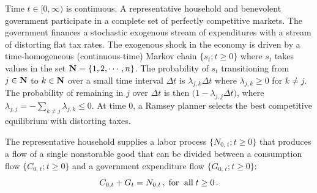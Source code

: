 \documentclass[12pt]{article}
\begin{document}
Time $t \in [0, \infty)$ is continuous.  
A representative household and  benevolent government  participate  in  a complete set of  perfectly competitive markets.  The government finances a stochastic exogenous stream of expenditures with  a stream of distorting  flat tax rates. %
The exogenous  shock in the economy is driven by a time-homogeneous (continuous-time) Markov chain $\{s_t; t\geq 0\}$ where $s_t$ takes values in the set ${\bf N} = \{1, 2, \cdots, n\}$. The probability of $s_t$ transitioning from  $j\in {\bf N} $ to $k \in {\bf N}$ over a small time interval $\Delta t$ is  $\lambda_{j, k}\Delta t$ where $\lambda_{j, k} \geq 0$  for   $k\neq j$. The probability of remaining in  $j$ over $\Delta t$ is then $\big(1-\lambda_{j, j} \Delta t\big) $,  where $\lambda_{j, j} =  -\sum_{k\neq j} \lambda_{j, k}\leq 0$. %
 At time $0$, a Ramsey planner    selects the best competitive equilibrium with distorting taxes.








The representative  household supplies  a labor process $%
\{N_{0,\,t}; t\geq 0 \}$ that produces a flow  of a single nonstorable good that can be divided between a consumption flow $%
 \{C_{0,\,t}; t\geq 0 \}$  and a government
expenditure flow  $%
 \{G_{0,\,t}; t\geq 0 \}$: %
\begin{equation}\label{resourceconstraint}
	C_{0, t}+G_t = N_{0, t} \, ,\; \text{for\; all}\; t\geq 0\, . 
\end{equation}
\end{document}
